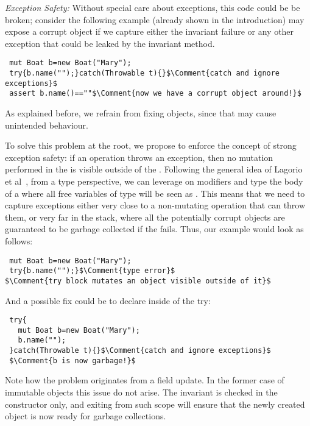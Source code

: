 \noindent
\textit{Exception Safety:}
Without special care about exceptions, 
this code could be be broken;
consider the following example (already shown in the introduction)
may expose a corrupt object 
if we capture either the invariant failure or any other exception
that could be leaked by the invariant method.
\saveSpace\begin{lstlisting}
 mut Boat b=new Boat("Mary");
 try{b.name("");}catch(Throwable t){}$\Comment{catch and ignore exceptions}$
 assert b.name()==""$\Comment{now we have a corrupt object around!}$
\end{lstlisting}
\saveSpace
As explained before, we refrain from fixing objects, since that may cause unintended behaviour.

To solve this problem at the root, we propose to enforce the concept of strong exception safety:
if an operation throws an exception, then no mutation performed in the \Q@try@ is visible outside of the \Q@try@.
Following the general idea of Lagorio et al~\cite{JOT:issue_2011_01/article1}, from a type perspective, we can leverage on modifiers and type the body of a \Q@try@ where all free variables of type \Q@mut@ will be seen as \Q@read@.
This means that we need to capture exceptions either very close to a non-mutating operation that can throw them, or very far in the stack, where all the potentially corrupt objects are guaranteed to be garbage collected if the \Q@try@ fails.
Thus, our example would look as follows:
\saveSpace
\begin{lstlisting}
 mut Boat b=new Boat("Mary");
 try{b.name("");}$\Comment{type error}$
$\Comment{try block mutates an object visible outside of it}$
\end{lstlisting}
\saveSpace
And a possible fix could be to declare \Q@b@ inside of the try:
\saveSpace\begin{lstlisting}
 try{
   mut Boat b=new Boat("Mary");
   b.name("");
 }catch(Throwable t){}$\Comment{catch and ignore exceptions}$
 $\Comment{b is now garbage!}$
\end{lstlisting}
\saveSpace
Note how the problem originates from a field update.
In the former case of immutable objects this
issue do not arise.
The invariant is checked in the constructor only, and exiting from such scope will ensure that the newly created object is now ready for garbage collections.


